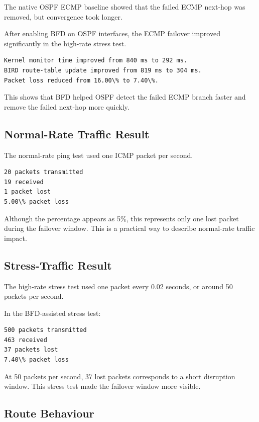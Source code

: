 The native OSPF ECMP baseline showed that the failed ECMP next-hop was removed, but convergence took longer.

After enabling BFD on OSPF interfaces, the ECMP failover improved significantly in the high-rate stress test.

\begin{verbatim}
Kernel monitor time improved from 840 ms to 292 ms.
BIRD route-table update improved from 819 ms to 304 ms.
Packet loss reduced from 16.00\% to 7.40\%.
\end{verbatim}

This shows that BFD helped OSPF detect the failed ECMP branch faster and remove the failed next-hop more quickly.

\subsection{Normal-Rate Traffic Result}

The normal-rate ping test used one ICMP packet per second.

\begin{verbatim}
20 packets transmitted
19 received
1 packet lost
5.00\% packet loss
\end{verbatim}

Although the percentage appears as 5\%, this represents only one lost packet during the failover window. This is a practical way to describe normal-rate traffic impact.

\subsection{Stress-Traffic Result}

The high-rate stress test used one packet every 0.02 seconds, or around 50 packets per second.

In the BFD-assisted stress test:

\begin{verbatim}
500 packets transmitted
463 received
37 packets lost
7.40\% packet loss
\end{verbatim}

At 50 packets per second, 37 lost packets corresponds to a short disruption window. This stress test made the failover window more visible.

\subsection{Route Behaviour}

